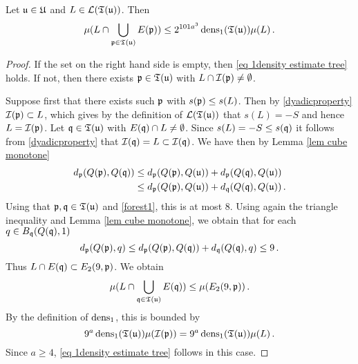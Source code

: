\begin{lemma}
    \label{lem 1density estimate tree}
    Let $\mathfrak u \in \mathfrak U$ and $L \in \mathcal{L}(\mathfrak T(\mathfrak u))$. Then
    \begin{equation}
    \label{eq 1density estimate tree}
        \mu(L \cap \bigcup_{\mathfrak p \in \mathfrak T(\mathfrak u)} E(\mathfrak p)) \le 2^{101a^3} \operatorname{\operatorname{dens}}_1(\mathfrak T(\mathfrak u)) \mu(L)\,.
    \end{equation}
\end{lemma}

\begin{proof}
    If the set on the right hand side is empty, then \eqref{eq 1density estimate tree} holds. If not, then there exists $\mathfrak p \in \mathfrak T(\mathfrak u)$ with $L \cap \mathcal{I}(\mathfrak p) \ne \emptyset$.

    Suppose first that there exists such $\mathfrak p$ with $s(\mathfrak p) \le s(L)$. Then by \eqref{dyadicproperty} $\mathcal{I}(\mathfrak p) \subset L$, which gives by the definition of $\mathcal{L}(\mathfrak T(\mathfrak u))$ that $s(L) = -S$ and hence $L = \mathcal{I}(\mathfrak p)$. Let $\mathfrak q \in \mathfrak T(\mathfrak u)$ with $E(\mathfrak q) \cap L \ne \emptyset$. Since $s(L) = -S \le s(\mathfrak q)$ it follows from \eqref{dyadicproperty} that $\mathcal{I}(\mathfrak q) = L \subset \mathcal{I}(\mathfrak q)$. We have then by Lemma \ref{lem cube monotone}
    \begin{align*}
        d_{\mathfrak p}(Q(\mathfrak p), Q(\mathfrak q)) &\le d_{\mathfrak p}(Q(\mathfrak p), Q(\mathfrak u)) + d_{\mathfrak p}(Q(\mathfrak q), Q(\mathfrak u))\\
        &\le d_{\mathfrak p}(Q(\mathfrak p), Q(\mathfrak u)) + d_{\mathfrak q}(Q(\mathfrak q), Q(\mathfrak u))\,.
    \end{align*}
    Using that $\mathfrak p, \mathfrak q \in \mathfrak T(\mathfrak u)$ and \eqref{forest1}, this is at most $8$. Using again the triangle inequality and Lemma \ref{lem cube monotone}, we obtain that for each $q \in B_{\mathfrak q}(Q(\mathfrak q), 1)$
    $$
        d_{\mathfrak p}(Q(\mathfrak p), q) \le d_{\mathfrak p}(Q(\mathfrak p), Q(\mathfrak q)) + d_{\mathfrak q}(Q(\mathfrak q), q) \le 9\,.
    $$
    Thus $L \cap E(\mathfrak q) \subset E_2(9, \mathfrak p)$. We obtain
    $$
        \mu(L \cap \bigcup_{\mathfrak q \in \mathfrak T(\mathfrak u)} E(\mathfrak q)) \le \mu(E_2(9, \mathfrak p))\,.
    $$
    By the definition of $\operatorname{\operatorname{dens}}_1$, this is bounded by
    $$
        9^a \operatorname{\operatorname{dens}}_1(\mathfrak T(\mathfrak u)) \mu(\mathcal{I}(\mathfrak p)) =9^a \operatorname{\operatorname{dens}}_1(\mathfrak T(\mathfrak u)) \mu(L)\,.
    $$
    Since $a \ge 4$, \eqref{eq 1density estimate tree} follows in this case.


\end{proof}
